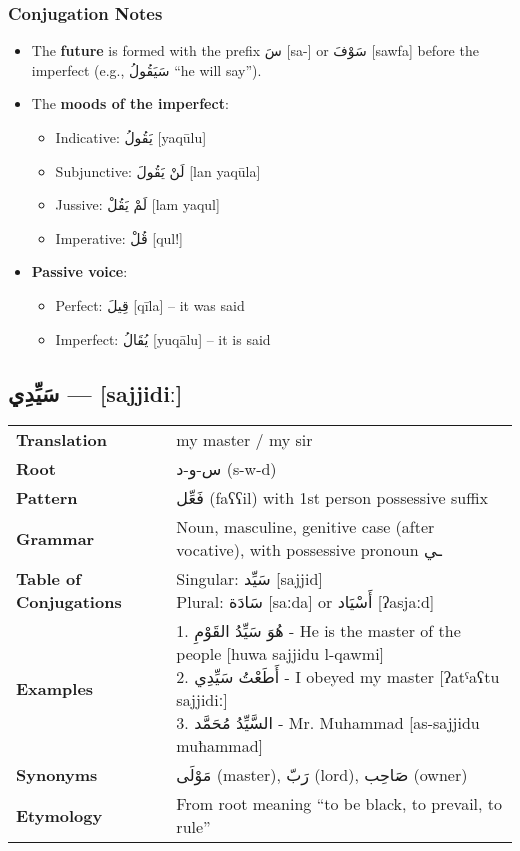 \documentclass[letter,12pt]{article}
\begin{document}
\subsubsection*{Conjugation Notes}
\begin{itemize}
  \item The \textbf{future} is formed with the prefix \textarabic{سَ} [sa-] or \textarabic{سَوْفَ} [sawfa] before the imperfect (e.g., \textarabic{سَيَقُولُ} “he will say”).
  \item The \textbf{moods of the imperfect}: 
    \begin{itemize}
      \item Indicative: \textarabic{يَقُولُ} [yaqūlu] 
      \item Subjunctive: \textarabic{لَنْ يَقُولَ} [lan yaqūla]
      \item Jussive: \textarabic{لَمْ يَقُلْ} [lam yaqul]
      \item Imperative: \textarabic{قُلْ} [qul!]
    \end{itemize}
  \item \textbf{Passive voice}: 
    \begin{itemize}
      \item Perfect: \textarabic{قِيلَ} [qīla] – it was said
      \item Imperfect: \textarabic{يُقَالُ} [yuqālu] – it is said
    \end{itemize}
\end{itemize}

\subsection{\textarabic{سَيِّدِي} — [sajjidiː]}

\begin{tabular}{p{3cm}p{10cm}}
\toprule
\textbf{Translation} & my master / my sir \\
\textbf{Root} & \textarabic{س-و-د} (s-w-d) \\
\textbf{Pattern} & \textarabic{فَعِّل} (faʕʕil) with 1st person possessive suffix \\
\textbf{Grammar} & Noun, masculine, genitive case (after vocative), with possessive pronoun \textarabic{ـي} \\
\textbf{Table of Conjugations} & \makecell[l]{
Singular: \textarabic{سَيِّد} [sajjid]\\
Plural: \textarabic{سَادَة} [saːda] or \textarabic{أَسْيَاد} [ʔasjaːd]
} \\
\textbf{Examples} & \makecell[l]{\parbox{9.5cm}{
1. \textarabic{هُوَ سَيِّدُ القَوْمِ} - He is the master of the people [huwa sajjidu l-qawmi]\\
2. \textarabic{أَطَعْتُ سَيِّدِي} - I obeyed my master [ʔatˤaʕtu sajjidiː]\\
3. \textarabic{السَّيِّدُ مُحَمَّد} - Mr. Muhammad [as-sajjidu muħammad]
}} \\
\midrule
\textbf{Synonyms} & \textarabic{مَوْلَى} (master), \textarabic{رَبّ} (lord), \textarabic{صَاحِب} (owner) \\
\textbf{Etymology} & From root meaning ``to be black, to prevail, to rule'' \\
\bottomrule
\end{tabular}
\end{document}
